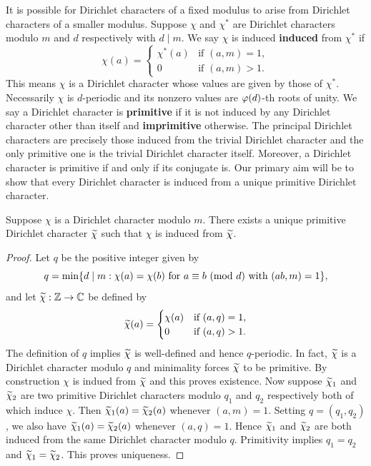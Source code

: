     It is possible for Dirichlet characters of a fixed modulus to arise from Dirichlet characters of a smaller modulus. Suppose \(\chi\) and \(\chi^{\ast}\) are Dirichlet characters modulo \(m\) and \(d\) respectively with \(d \mid m\). We say \(\chi\) is induced \textbf{induced} from \(\chi^{\ast}\) if
    \[
      \chi(a) = \begin{cases} \chi^{\ast}(a) & \text{if \((a,m) = 1\)}, \\ 0 & \text{if \((a,m) > 1\)}. \end{cases}
    \] 
    This means \(\chi\) is a Dirichlet character whose values are given by those of \(\chi^{\ast}\). Necessarily \(\chi\) is \(d\)-periodic and its nonzero values are \(\varphi(d)\)-th roots of unity. We say a Dirichlet character is \textbf{primitive} if it is not induced by any Dirichlet character other than itself and \textbf{imprimitive} otherwise. The principal Dirichlet characters are precisely those induced from the trivial Dirichlet character and the only primitive one is the trivial Dirichlet character itself. Moreover, a Dirichlet character is primitive if and only if its conjugate is. Our primary aim will be to show that every Dirichlet character is induced from a unique primitive Dirichlet character. 
    
    \begin{theorem}\label{thm:Dirichlet_character_conductor_existance}
      Suppose \(\chi\) is a Dirichlet character modulo \(m\). There exists a unique primitive Dirichlet character \(\widetilde{\chi}\) such that \(\chi\) is induced from \(\widetilde{\chi}\).
    \end{theorem}
    \begin{proof}
      Let \(q\) be the positive integer given by
      \[
        q = \min\{d \mid m:\chi(a) = \chi(b) \text{ for } a \equiv b \ (\mathrm{mod}\text{ }d) \text{ with } (ab,m) = 1\},
      \]
      and let \(\widetilde{\chi}:\mathbb{Z} \to \mathbb{C}\) be defined by
      \[
        \widetilde{\chi}(a) = \begin{cases} \chi(a) & \text{if \((a,q) = 1\)}, \\ 0 & \text{if \((a,q) > 1\)}. \end{cases}
      \]
      The definition of \(q\) implies \(\widetilde{\chi}\) is well-defined and hence \(q\)-periodic. In fact, \(\widetilde{\chi}\) is a Dirichlet character modulo \(q\) and minimality forces \(\widetilde{\chi}\) to be primitive. By construction \(\chi\) is indued from \(\widetilde{\chi}\) and this proves existence. Now suppose \(\widetilde{\chi}_{1}\) and \(\widetilde{\chi}_{2}\) are two primitive Dirichlet characters modulo \(q_{1}\) and \(q_{2}\) respectively both of which induce \(\chi\). Then \(\widetilde{\chi}_{1}(a) = \widetilde{\chi}_{2}(a)\) whenever \((a,m) = 1\). Setting \(q = (q_{1},q_{2})\), we also have \(\widetilde{\chi}_{1}(a) = \widetilde{\chi}_{2}(a)\) whenever \((a,q) = 1\). Hence \(\widetilde{\chi}_{1}\) and \(\widetilde{\chi}_{2}\) are both induced from the same Dirichlet character modulo \(q\). Primitivity implies \(q_{1} = q_{2}\) and \(\widetilde{\chi}_{1} = \widetilde{\chi}_{2}\). This proves uniqueness.
    \end{proof}

